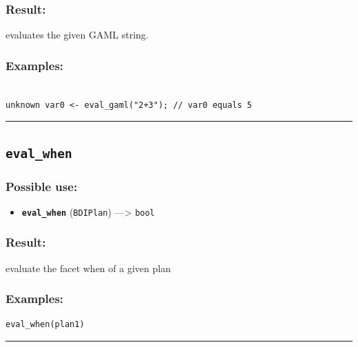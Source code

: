 \documentclass[]{book}
\providecommand{\tightlist}{%
  \setlength{\itemsep}{0pt}\setlength{\parskip}{0pt}}
\theoremstyle{definition}
\theoremstyle{definition}
\theoremstyle{definition}
\theoremstyle{remark}
\begin{document}
\subsubsection{Result:}\label{result-148}

evaluates the given GAML string.

\subsubsection{Examples:}\label{examples-114}

\begin{verbatim}
 
unknown var0 <- eval_gaml("2+3"); // var0 equals 5
\end{verbatim}

\begin{center}\rule{0.5\linewidth}{\linethickness}\end{center}

\subsection{\texorpdfstring{\texttt{eval\_when}}{eval\_when}}\label{eval_when}

\subsubsection{Possible use:}\label{possible-use-155}

\begin{itemize}
\tightlist
\item
  \textbf{\texttt{eval\_when}} (\texttt{BDIPlan}) ---\textgreater{}
  \texttt{bool}
\end{itemize}

\subsubsection{Result:}\label{result-149}

evaluate the facet when of a given plan

\subsubsection{Examples:}\label{examples-115}

\begin{verbatim}
eval_when(plan1) 
\end{verbatim}

\begin{center}\rule{0.5\linewidth}{\linethickness}\end{center}
\end{document}
